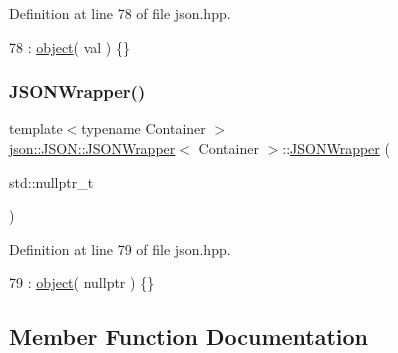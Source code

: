 Definition at line 78 of file json.\+hpp.


\begin{DoxyCode}
78 : \mbox{\hyperlink{classjson_1_1_j_s_o_n_1_1_j_s_o_n_wrapper_ab17f9cb0bc7be00173c3fdd75d2d0b73}{object}}( val ) \{\}
\end{DoxyCode}
\mbox{\label{classjson_1_1_j_s_o_n_1_1_j_s_o_n_wrapper_a79602600f3d34881c6d4ea9d870b1213}} 
\subsubsection{\texorpdfstring{J\+S\+O\+N\+Wrapper()}{JSONWrapper()}\hspace{0.1cm}{\footnotesize\ttfamily [2/2]}}
{\footnotesize\ttfamily template$<$typename Container $>$ \\
\mbox{\hyperlink{classjson_1_1_j_s_o_n_1_1_j_s_o_n_wrapper}{json\+::\+J\+S\+O\+N\+::\+J\+S\+O\+N\+Wrapper}}$<$ Container $>$\+::\mbox{\hyperlink{classjson_1_1_j_s_o_n_1_1_j_s_o_n_wrapper}{J\+S\+O\+N\+Wrapper}} (\begin{DoxyParamCaption}\item[{std\+::nullptr\+\_\+t}]{ }\end{DoxyParamCaption})\hspace{0.3cm}{\ttfamily [inline]}}



Definition at line 79 of file json.\+hpp.


\begin{DoxyCode}
79 : \mbox{\hyperlink{classjson_1_1_j_s_o_n_1_1_j_s_o_n_wrapper_ab17f9cb0bc7be00173c3fdd75d2d0b73}{object}}( \textcolor{keyword}{nullptr} ) \{\}
\end{DoxyCode}


\subsection{Member Function Documentation}
\mbox{\label{classjson_1_1_j_s_o_n_1_1_j_s_o_n_wrapper_a86f4b41d1b0e923713be08f82aba402a}} 
